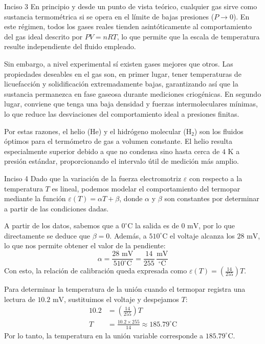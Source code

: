 \documentclass[11pt,letterpaper]{article}
\begin{document}
\begin{inciso}{Inciso 3}
En principio y desde un punto de vista teórico, cualquier gas sirve como sustancia termométrica si se opera en el límite de bajas presiones ($P \to 0$). En este régimen, todos los gases reales tienden asintóticamente al comportamiento del gas ideal descrito por $PV = nRT$, lo que permite que la escala de temperatura resulte independiente del fluido empleado.

Sin embargo, a nivel experimental sí existen gases mejores que otros. Las propiedades deseables en el gas son, en primer lugar, tener temperaturas de licuefacción y solidificación extremadamente bajas, garantizando así que la sustancia permanezca en fase gaseosa durante mediciones criogénicas. En segundo lugar, conviene que tenga una baja densidad y fuerzas intermoleculares mínimas, lo que reduce las desviaciones del comportamiento ideal a presiones finitas.

Por estas razones, el helio ($\text{He}$) y el hidrógeno molecular ($\text{H}_{2}$) son los fluidos óptimos para el termómetro de gas a volumen constante. El helio resulta especialmente superior debido a que no condensa sino hasta cerca de $4\text{ K}$ a presión estándar, proporcionando el intervalo útil de medición más amplio.
\end{inciso}
\begin{inciso}{Inciso 4}
Dado que la variación de la fuerza electromotriz $\varepsilon$ con respecto a la temperatura $T$ es lineal, podemos modelar el comportamiento del termopar mediante la función $\varepsilon(T) = \alpha T + \beta$, donde $\alpha$ y $\beta$ son constantes por determinar a partir de las condiciones dadas. 

A partir de los datos, sabemos que a $0^\circ\text{C}$ la salida es de $0\text{ mV}$, por lo que directamente se deduce que $\beta = 0$. Además, a $510^\circ\text{C}$ el voltaje alcanza los $28\text{ mV}$, lo que nos permite obtener el valor de la pendiente:
\begin{equation*}
    \alpha = \frac{28\text{ mV}}{510^\circ\text{C}} = \frac{14}{255}\,\frac{\text{mV}}{^\circ\text{C}}
\end{equation*}
Con esto, la relación de calibración queda expresada como $\varepsilon(T) = \left(\frac{14}{255}\right) T$.

Para determinar la temperatura de la unión cuando el termopar registra una lectura de $10.2\text{ mV}$, sustituimos el voltaje y despejamos $T$:
\begin{align*}
    10.2 &= \left(\frac{14}{255}\right) T \\
    T &= \frac{10.2 \times 255}{14} \approx 185.79^\circ\text{C}
\end{align*}
Por lo tanto, la temperatura en la unión variable corresponde a $185.79^\circ\text{C}$.
\end{inciso}
\end{document}
